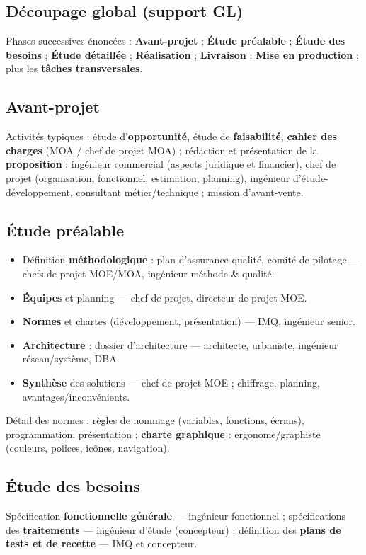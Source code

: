 \documentclass[11pt,a4paper]{article}
\begin{document}
\subsection{Découpage global (support GL)}
Phases successives énoncées : \textbf{Avant-projet} ; \textbf{Étude préalable} ; \textbf{Étude des besoins} ; \textbf{Étude détaillée} ; \textbf{Réalisation} ; \textbf{Livraison} ; \textbf{Mise en production} ; plus les \textbf{tâches transversales}.

\subsection{Avant-projet}
Activités typiques : étude d'\textbf{opportunité}, étude de \textbf{faisabilité}, \textbf{cahier des charges} (MOA / chef de projet MOA) ; rédaction et présentation de la \textbf{proposition} : ingénieur commercial (aspects juridique et financier), chef de projet (organisation, fonctionnel, estimation, planning), ingénieur d'étude-développement, consultant métier/technique ; mission d'avant-vente.

\subsection{Étude préalable}
\begin{itemize}[nosep]
  \item Définition \textbf{méthodologique} : plan d'assurance qualité, comité de pilotage — chefs de projet MOE/MOA, ingénieur méthode \& qualité.
  \item \textbf{Équipes} et planning — chef de projet, directeur de projet MOE.
  \item \textbf{Normes} et chartes (développement, présentation) — IMQ, ingénieur senior.
  \item \textbf{Architecture} : dossier d'architecture — architecte, urbaniste, ingénieur réseau/système, DBA.
  \item \textbf{Synthèse} des solutions — chef de projet MOE ; chiffrage, planning, avantages/inconvénients.
\end{itemize}
Détail des normes : règles de nommage (variables, fonctions, écrans), programmation, présentation ; \textbf{charte graphique} : ergonome/graphiste (couleurs, polices, icônes, navigation).

\subsection{Étude des besoins}
Spécification \textbf{fonctionnelle générale} — ingénieur fonctionnel ; spécifications des \textbf{traitements} — ingénieur d'étude (concepteur) ; définition des \textbf{plans de tests et de recette} — IMQ et concepteur.
\end{document}
